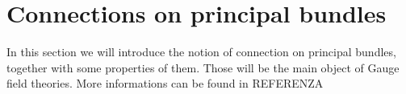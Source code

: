 \documentclass[12pt,a4paper]{report}
\theoremstyle{definition}
\theoremstyle{Theorem}
\newtheorem{Prop}[Def]{Proposition}
\theoremstyle{definition}
\newtheorem{Ex}[Def]{Example}
\theoremstyle{definition}
\begin{document}
	\section{Connections on principal bundles}
		In this section we will introduce the notion of connection on principal bundles, together with some properties of them. Those will be the main object of Gauge field theories. More informations can be found in REFERENZA
	\begin{comment}
		\chapter{Connections on Principal bundles}
		\section{Fundamental vector fields}
		Suppose to have a Lie group $G$ that right-acts smoothly on a manifold $M$. Then, consider any element $A\in\mathfrak{g}$ inside the Lie Algebra of $G$. Define:
		$$\bar{A}={d\over dt}\bigg|_{t=0}p\cdot e^{tA}\in T_pM$$
		This, at any point is called \textbf{fundamental vector field associated to $A$}.\\
		\begin{center}
			\texttt{[image: fundamental\_vector.pdf]}
		\end{center}
		The idea is to take a point $p\in M$ and a curve passing through it like $c_p(t)=p\cdot e^{tA}$. This is a smooth curve and so it can be derived. The fundamental vector field in $p$ is the initial tangent vector of this curve (initial in the sense that for $t=0$ the curve goes through $p$).
		\begin{Prop}
			The fundamentale vector field associated to $A$ is always smooth.
		\end{Prop}
		\begin{proof}
			Non ne ho voglia ma è una cazzata di conti.
		\end{proof}
		There is an alternative mathematical construction for the same concept: define the map $j_p:G\rightarrow M$ like follows:
		$$j_p(g)=p\cdot g$$
		Its differential is defined as:
		$$dj_p(A\in\mathfrak{g})={d\over dt}\bigg|_{t=0}j_p(e^{tA})={d\over dt}\bigg|_{t=0}p\cdot e^{tA}$$
		\begin{Ex}
			Consider the flat Euclidean manifold $\mathbb{R}^2$ and the Lie group $U(1)$ of complex modulo 1 numbers. The Lie algebra of the group is $\mathfrak{u}(1)={i\theta;\theta\in\mathbb{R}}$ made up of all multiples of $i$. We set the following action of $U(1)$ on $\mathbb{R}^2$ given by: $e^{i\theta}(x,y)=(xcos(\theta)-ysin\theta,ycos(\theta)+xsin(\theta))$.

\end{comment}
\end{document}
